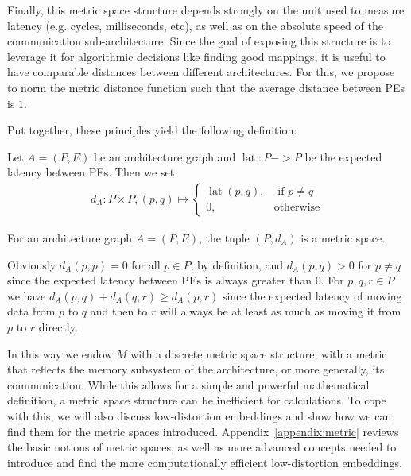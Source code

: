 Finally, this metric space structure depends strongly on the unit used to measure latency (e.g. cycles, milliseconds, etc), as well as on the absolute speed of the communication sub-architecture.
Since the goal of exposing this structure is to leverage it for algorithmic decisions like finding good mappings, it is useful to have comparable distances between different architectures.
For this, we propose to norm the metric distance function such that the average distance between \acp{PE} is $1$.

Put together, these principles yield the following definition:
\begin{defn}
	\label{defn:metric_simple}
Let $A = (P,E)$ be an architecture graph and $\operatorname{lat} : P -> P$ be the expected latency between PEs.
Then we set
\begin{align}
  d_A : P \times P, (p,q) \mapsto \left\{
      \begin{array}{rr}
        \operatorname{lat}(p,q), & \text{ if } p \neq q \\
        0, & \text{otherwise}
      \end{array} \right.
      \end{align}
\end{defn}
\begin{rem}
For an architecture graph $A = (P,E)$, the tuple $(P,d_A)$ is a metric space.
\begin{bew}
Obviously $d_A(p,p) = 0$ for all $p \in P$, by definition, and $d_A(p,q) > 0$ for $p \neq q$ since the expected latency between PEs is always greater than 0.
For $p,q,r \in P$ we have $d_A(p,q) + d_A(q,r) \geq d_A(p,r)$ since the expected latency of moving data from $p$ to $q$ and then to $r$ will always be at least as much as moving it from $p$ to $r$ directly.
\end{bew}
\end{rem}


In this way we endow $M$ with a discrete metric space structure, with a metric that reflects the memory subsystem of the architecture, or more generally, its communication.
While this allows for a simple and powerful mathematical definition, a metric space structure can be inefficient for calculations.
To cope with this, we will also discuss low-distortion embeddings and show how we can find them for the metric spaces introduced.
Appendix~\ref{appendix:metric} reviews the basic notions of metric spaces, as well as more advanced concepts needed to introduce and find the more computationally efficient low-distortion embeddings.

